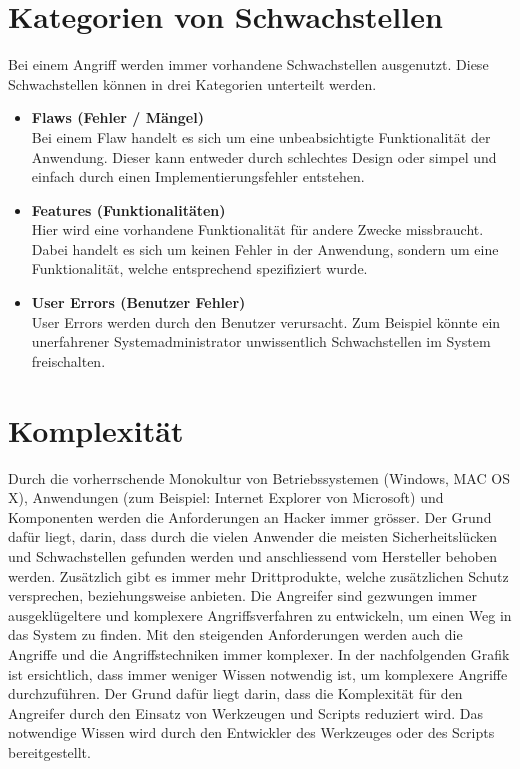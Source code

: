 \section{Kategorien von Schwachstellen}
Bei einem Angriff werden immer vorhandene Schwachstellen ausgenutzt. Diese Schwachstellen können in drei Kategorien unterteilt werden.

\begin{itemize}
\item \textbf{Flaws (Fehler / Mängel)} \\
Bei einem Flaw handelt es sich um eine unbeabsichtigte Funktionalität der Anwendung. Dieser kann entweder durch schlechtes Design oder simpel und einfach durch einen Implementierungsfehler entstehen.
\item \textbf{Features (Funktionalitäten)} \\
Hier wird eine vorhandene Funktionalität für andere Zwecke missbraucht. Dabei handelt es sich um keinen Fehler in der Anwendung, sondern um eine Funktionalität, welche entsprechend spezifiziert wurde.
\item \textbf{User Errors (Benutzer Fehler)} \\
User Errors werden durch den Benutzer verursacht. Zum Beispiel könnte ein unerfahrener Systemadministrator unwissentlich Schwachstellen im System freischalten.
\end{itemize}


\section{Komplexität}
Durch die vorherrschende Monokultur von Betriebssystemen (Windows, MAC OS X), Anwendungen (zum Beispiel: Internet Explorer von Microsoft) und Komponenten werden die Anforderungen an Hacker immer grösser. Der Grund dafür liegt, darin, dass durch die vielen Anwender die meisten Sicherheitslücken und Schwachstellen gefunden werden und anschliessend vom Hersteller behoben werden. Zusätzlich gibt es immer mehr Drittprodukte, welche zusätzlichen Schutz versprechen, beziehungsweise anbieten. Die Angreifer sind gezwungen immer ausgeklügeltere und komplexere Angriffsverfahren zu entwickeln, um einen Weg in das System zu finden. Mit den steigenden Anforderungen werden auch die Angriffe und die Angriffstechniken immer komplexer. In der nachfolgenden Grafik ist ersichtlich, dass immer weniger Wissen notwendig ist, um komplexere Angriffe durchzuführen. Der Grund dafür liegt darin, dass die Komplexität für den Angreifer durch den Einsatz von Werkzeugen und Scripts reduziert wird. Das notwendige Wissen wird durch den Entwickler des Werkzeuges oder des Scripts bereitgestellt.

